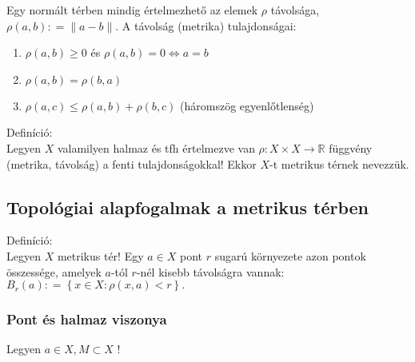 \documentclass[12pt,a4paper]{scrartcl}
\providecommand{\tightlist}{%
  \setlength{\itemsep}{0pt}\setlength{\parskip}{0pt}}
\newenvironment{definicio}{}{}
\begin{document}
Egy normált térben mindig értelmezhető az elemek \(\rho\) távolsága,
\(\rho\left( {a,b} \right): = \left\| {a - b} \parallel \right.\). A
távolság (metrika) tulajdonságai:

\begin{enumerate}
\def\labelenumi{\arabic{enumi}.}
\tightlist
\item
  \(\rho\left( {a,b} \right) \geq 0\) és
  \(\left. \rho\left( {a,b} \right) = 0\Leftrightarrow a = b \right.\)
\item
  \(\rho\left( {a,b} \right) = \rho\left( {b,a} \right)\)
\item
  \(\rho\left( {a,c} \right) \leq \rho\left( {a,b} \right) + \rho\left( {b,c} \right)\)
  (háromszög egyenlőtlenség)
\end{enumerate}

\begin{definicio}

Definíció:\\
Legyen \(X\) valamilyen halmaz és tfh értelmezve van
\(\left. \rho:X \times X\rightarrow{\mathbb{R}} \right.\) függvény
(metrika, távolság) a fenti tulajdonságokkal! Ekkor \(X\)-t metrikus
térnek nevezzük.

\end{definicio}

\hypertarget{topologiai-alapfogalmak-a-metrikus-terben}{%
\subsection{Topológiai alapfogalmak a metrikus
térben}\label{topologiai-alapfogalmak-a-metrikus-terben}}

\begin{definicio}

Definíció:\\
Legyen \(X\) metrikus tér! Egy \(a \in X\) pont \(r\) sugarú környezete
azon pontok összessége, amelyek \(a\)-tól \(r\)-nél kisebb távolságra
vannak:
\({B_{r}\left( a \right): = \left\{ {x \in X:\rho\left( {x,a} \right) < r} \right\}}.\)

\end{definicio}

\hypertarget{pont-es-halmaz-viszonya}{%
\subsubsection{Pont és halmaz viszonya}\label{pont-es-halmaz-viszonya}}

Legyen \(a \in X,M \subset X\) !
\end{document}
